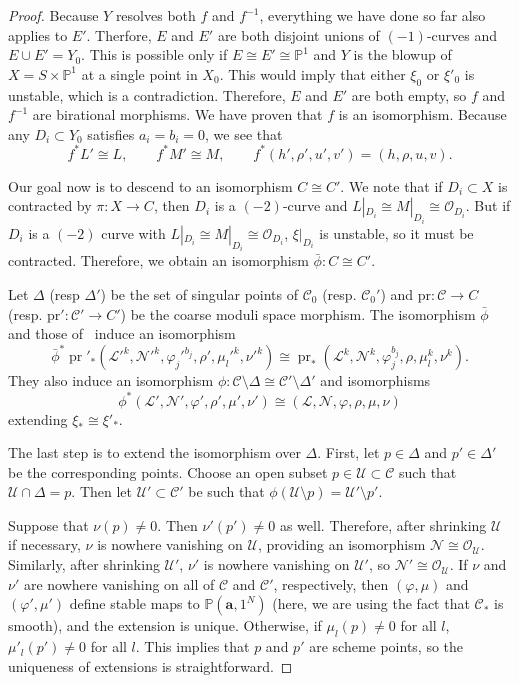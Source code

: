 \documentclass{amsart}
\theoremstyle{definition}
\theoremstyle{remark}
\theoremstyle{plain}
\theoremstyle{definition}
\theoremstyle{remark}
\renewcommand{\P}{\mathbb{P}}
\newcommand{\ba}{\mathbf{a}}
\newcommand{\mc}[1]{\mathcal{#1}}
\newcommand{\mr}[1]{\mathrm{#1}}
\newcommand{\on}[1]{\operatorname{#1}}
\newcommand{\1}{\mathbf{1}}
\newcommand{\2}{\mathbf{2}}
\newcommand{\3}{\mathbf{3}}
\begin{document}
\begin{proof}
    Because $Y$ resolves both $f$ and $f^{-1}$, everything we have done so far also applies to $E'$. Therfore, $E$ and $E'$ are both disjoint unions of $(-1)$-curves and $E \cup E' = Y_0$. This is possible only if $E \cong E' \cong \P^1$ and $Y$ is the blowup of $X = S \times \P^1$ at a single point in $X_0$. This would imply that either $\xi_0$ or $\xi'_0$ is unstable, which is a contradiction. Therefore, $E$ and $E'$ are both empty, so $f$ and $f^{-1}$ are birational morphisms. We have proven that $f$ is an isomorphism. Because any $D_i \subset Y_0$ satisfies $a_i = b_i = 0$, we see that
    \begin{equation}\label{eqn:cmsiso} 
        f^* L' \cong L, \qquad f^* M' \cong M, \qquad f^*(h',\rho',u',v') = (h,\rho,u,v). 
    \end{equation}


    Our goal now is to descend to an isomorphism $C \cong C'$. We note that if $D_i \subset X$ is contracted by $\pi \colon X \to C$, then $D_i$ is a $(-2)$-curve and $L|_{D_i} \cong M|_{D_i} \cong \mc{O}_{D_i}$. But if $D_i$ is a $(-2)$ curve with $L|_{D_i} \cong M|_{D_i} \cong \mc{O}_{D_i}$, $\xi|_{D_i}$ is unstable, so it must be contracted. Therefore, we obtain an isomorphism $\bar{\phi} \colon C \cong C'$.

    Let $\Delta$ (resp $\Delta'$) be the set of singular points of $\mc{C}_0$ (resp. $\mc{C}_0'$) and $\mr{pr} \colon \mc{C} \to C$ (resp. $\mr{pr}' \colon \mc{C'} \to C'$) be the coarse moduli space morphism. The isomorphism $\bar{\phi}$ and those of~ induce an isomorphism
    \[ \bar{\phi}^* \on{pr}'_* (\mc{L}'^k, \mc{N}'^k, \varphi_j'^{b_j}, \rho', \mu_{l}'^k, \nu'^k) \cong \on{pr}_* (\mc{L}^k, \mc{N}^k, \varphi_j^{b_j}, \rho,\mu_{l}^k, \nu^k). \]
    They also induce an isomorphism $\phi \colon \mc{C} \setminus \Delta \cong \mc{C'} \setminus \Delta'$ and isomorphisms
    \[ \phi^* (\mc{L'}, \mc{N'}, \varphi', \rho', \mu', \nu') \cong (\mc{L}, \mc{N}, \varphi, \rho, \mu,\nu) \]
    extending $\xi_* \cong \xi'_*$.

    The last step is to extend the isomorphism over $\Delta$. First, let $p \in \Delta$ and $p' \in \Delta'$ be the corresponding points. Choose an open subset $p \in \mc{U} \subset \mc{C}$ such that $\mc{U} \cap \Delta = p$. Then let $\mc{U'} \subset \mc{C'}$ be such that $\phi(\mc{U} \setminus p) = \mc{U'} \setminus p'$.

    Suppose that $\nu(p) \neq 0$. Then $\nu'(p') \neq 0$ as well. Therefore, after shrinking $\mc{U}$ if necessary, $\nu$ is nowhere vanishing on $\mc{U}$, providing an isomorphism $\mc{N} \cong \mc{O}_{\mc{U}}$. Similarly, after shrinking $\mc{U'}$, $\nu'$ is nowhere vanishing on $\mc{U'}$, so $\mc{N'} \cong \mc{O}_{\mc{U}}$. If $\nu$ and $\nu'$ are nowhere vanishing on all of $\mc{C}$ and $\mc{C}'$, respectively, then $(\varphi, \mu)$ and $(\varphi', \mu')$ define stable maps to $\P(\ba,1^N)$ (here, we are using the fact that $\mc{C}_*$ is smooth), and the extension is unique. Otherwise, if $\mu_{l}(p) \neq 0$ for all $l$, $\mu'_{l}(p') \neq 0$ for all $l$. This implies that $p$ and $p'$ are scheme points, so the uniqueness of extensions is straightforward.


\end{proof}
\end{document}
